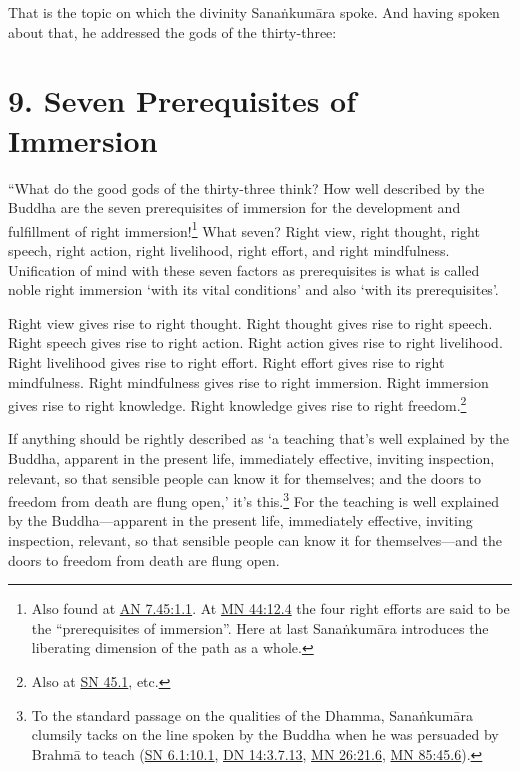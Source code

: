 \documentclass[12pt,openany]{book}%
\begin{document}
That is the topic on which the divinity \textsanskrit{Sanaṅkumāra} spoke. And having spoken about that, he addressed the gods of the thirty-three: 

\section*{9. Seven Prerequisites of Immersion }

“What do the good gods of the thirty-three think? How well described by the Buddha are the seven prerequisites of immersion for the development and fulfillment of right immersion!\footnote{Also found at \href{https://suttacentral.net/an7.45/en/sujato\#1.1}{AN 7.45:1.1}. At \href{https://suttacentral.net/mn44/en/sujato\#12.4}{MN 44:12.4} the four right efforts are said to be the “prerequisites of immersion”. Here at last \textsanskrit{Sanaṅkumāra} introduces the liberating dimension of the path as a whole. } What seven? Right view, right thought, right speech, right action, right livelihood, right effort, and right mindfulness. Unification of mind with these seven factors as prerequisites is what is called noble right immersion ‘with its vital conditions’ and also ‘with its prerequisites’. 

Right view gives rise to right thought. Right thought gives rise to right speech. Right speech gives rise to right action. Right action gives rise to right livelihood. Right livelihood gives rise to right effort. Right effort gives rise to right mindfulness. Right mindfulness gives rise to right immersion. Right immersion gives rise to right knowledge. Right knowledge gives rise to right freedom.\footnote{Also at \href{https://suttacentral.net/sn45.1/en/sujato}{SN 45.1}, etc. } 

If anything should be rightly described as ‘a teaching that’s well explained by the Buddha, apparent in the present life, immediately effective, inviting inspection, relevant, so that sensible people can know it for themselves; and the doors to freedom from death are flung open,’ it’s this.\footnote{To the standard passage on the qualities of the Dhamma, \textsanskrit{Sanaṅkumāra} clumsily tacks on the line spoken by the Buddha when he was persuaded by \textsanskrit{Brahmā} to teach (\href{https://suttacentral.net/sn6.1/en/sujato\#10.1}{SN 6.1:10.1}, \href{https://suttacentral.net/dn14/en/sujato\#3.7.13}{DN 14:3.7.13}, \href{https://suttacentral.net/mn26/en/sujato\#21.6}{MN 26:21.6}, \href{https://suttacentral.net/mn85/en/sujato\#45.6}{MN 85:45.6}). } For the teaching is well explained by the Buddha—apparent in the present life, immediately effective, inviting inspection, relevant, so that sensible people can know it for themselves—and the doors to freedom from death are flung open. 
\end{document}
